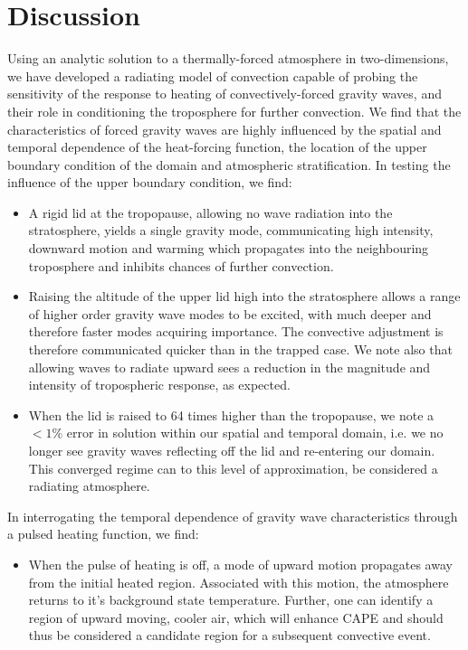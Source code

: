 \documentclass[a4paper,10pt]{article}
\begin{document}
\section{Discussion}
\label{discussion}
Using an analytic solution to a thermally-forced atmosphere in two-dimensions, we have developed a radiating model of convection capable of probing the sensitivity of 
the response to heating of convectively-forced gravity waves, and their role in conditioning the troposphere for further convection. 
We find that the characteristics of forced gravity waves are highly influenced by the spatial and temporal dependence of the 
heat-forcing function, the location of the upper boundary condition of the domain and atmospheric stratification. 
In testing the influence of the upper boundary condition, we find:
\begin{itemize}
 \item A rigid lid at the tropopause, allowing no wave radiation into the stratosphere, yields a single gravity mode, communicating high intensity, downward motion and warming which propagates into the neighbouring troposphere and inhibits chances of further convection.
 \item Raising the altitude of the upper lid high into the stratosphere allows a range of higher order gravity wave modes to be excited, with much deeper and therefore faster modes acquiring importance.  The convective adjustment is therefore communicated quicker than in the trapped case. We note also that allowing waves to radiate upward sees a reduction in the magnitude and intensity of tropospheric response, as expected. 
 \item When the lid is raised to 64 times higher than the tropopause, we note a $<1\%$ error in solution within our spatial and temporal domain, i.e. we no longer see gravity waves reflecting off the lid and re-entering our domain. This converged regime can to this level of approximation, be considered a radiating atmosphere. 
\end{itemize}
In interrogating the temporal dependence of gravity wave characteristics through a pulsed heating function, we find:
\begin{itemize}
 \item When the pulse of heating is off, a mode of upward motion propagates away from the initial heated region. Associated with this motion, the atmosphere returns to it's background state temperature. Further, one can identify a region of upward moving, cooler air, which will enhance CAPE and should thus be considered a candidate region for a subsequent convective event.  
\end{itemize}
\end{document}
